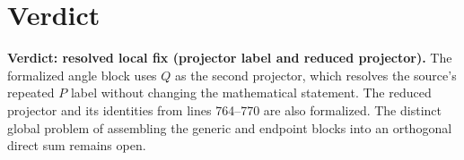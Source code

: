 \documentclass{article}
\begin{document}
\section{Verdict}

\textbf{Verdict: resolved local fix (projector label and reduced projector).}
The formalized angle block uses $Q$ as the second projector, which resolves the
source's repeated $P$ label without changing the mathematical statement. The
reduced projector and its identities from lines 764--770 are also formalized.
The distinct global problem of assembling the generic and endpoint blocks into
an orthogonal direct sum remains open.



\end{document}

